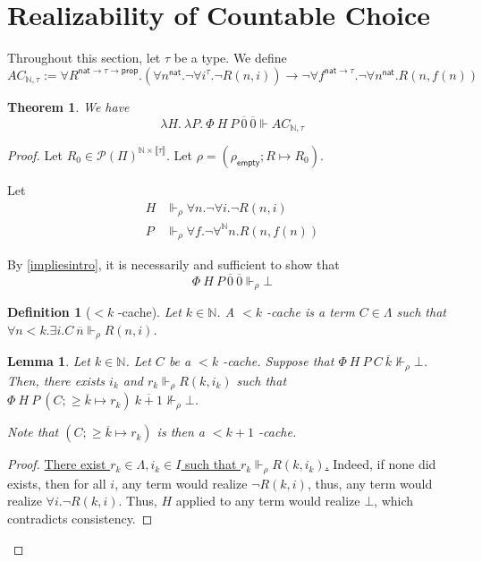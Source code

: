 \documentclass{article}
\newcommand{\N}{\mathbb{N}}
\newcommand{\nat}{\mathsf{nat}}
\newcommand{\depforall}[1]{\forall^\N #1.}
\newcommand{\realizes}{\Vdash}
\newcommand{\prop}{\mathsf{prop}}
\newcommand{\typeinterp}[1]{{\llbracket #1 \rrbracket}}
\newcommand{\powerset}[1]{\mathcal{P}(#1)}
\newcommand{\emptyval}{{\rho_\mathsf{empty}}}
\newtheorem{definition}{Definition}
\newtheorem{lemma}{Lemma}
\newtheorem{theorem}{Theorem}
\begin{document}
\section{Realizability of Countable Choice}

Throughout this section, let $\tau$ be a type.
We define
\[AC_{\N, \tau} := \forall R^{\nat \rightarrow \tau \rightarrow \prop}. (\forall n^\nat. \neg \forall i^\tau. \neg R(n, i)) \rightarrow \neg \forall f^{\nat \rightarrow \tau}. \neg \forall n^\nat. R(n, f(n))\]

\begin{theorem} We have
    \[ \lambda H.\ \lambda P.\ \Phi\ H\ P\ \overline{0}\ \overline{0} \realizes AC_{\N, \tau} \]
\end{theorem}

\begin{proof}
Let $R_0 \in \powerset{\Pi}^{\N \times \typeinterp{\tau}}$. Let $\rho = (\emptyval; R \mapsto R_0)$.

Let
\begin{align*}
    H & \realizes_\rho \forall n. \neg \forall i. \neg R(n, i) \\
    P & \realizes_\rho \forall f. \neg \depforall{n} R(n, f(n))
\end{align*}

By \cref{impliesintro}, it is necessarily and sufficient to show that
\[\Phi\ H\ P\ \overline{0}\ \overline{0} \realizes_\rho \bot \]

\begin{definition}[$<k$ -cache]
    Let $k \in \N$. A $<k$ -cache is a term $C \in \Lambda$ such that $\forall n < k. \exists i. C\ \overline{n} \realizes_\rho R(n, i)$.
\end{definition}

\begin{lemma}\label{growcache}
    Let $k \in \N$.
    Let $C$ be a $< k$ -cache.
    Suppose that $\Phi\ H\ P\ C\ \overline{k} \not\realizes_\rho \bot$.
    Then, there exists $i_k$ and $r_k \realizes_\rho R(k, i_k)$ such that $\Phi\ H\ P\ (C; \ge \overline{k} \mapsto r_k)\ \overline{k+1} \not\realizes_\rho \bot$.

    Note that $(C; \ge \overline{k} \mapsto r_k)$ is then a $< k + 1$ -cache.
\end{lemma}

\begin{proof}
    \ul{There exist $r_k \in \Lambda, i_k \in I$ such that $r_k \realizes_\rho R(k, i_k)$.} Indeed, if none did exists, then for all $i$, any term would realize $\neg R(k, i)$, thus, any term would realize $\forall i. \neg R(k, i)$. Thus, $H$ applied to any term would realize $\bot$, which contradicts consistency.


\end{proof}
\end{proof}
\end{document}

